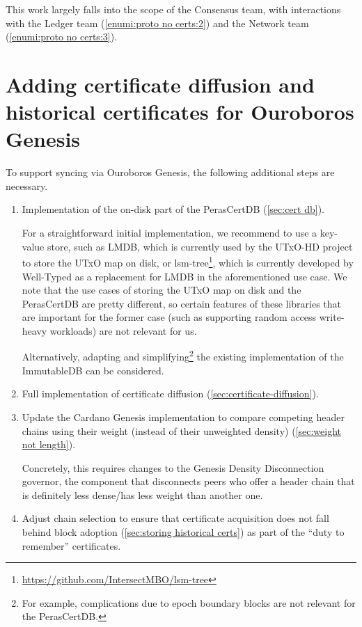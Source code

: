 This work largely falls into the scope of the Consensus team, with interactions with the Ledger team (\ref{enumi:proto no certs:2}) and the Network team (\ref{enumi:proto no certs:3}).

\section{Adding certificate diffusion and historical certificates for Ouroboros Genesis}\label{sec:implementation with genesis}

To support syncing via Ouroboros Genesis, the following additional steps are necessary.
\begin{enumerate}
\item
  Implementation of the on-disk part of the PerasCertDB (\cref{sec:cert db}).

  For a straightforward initial implementation, we recommend to use a key-value store, such as LMDB, which is currently used by the UTxO-HD project to store the UTxO map on disk, or lsm-tree\footnote{\url{https://github.com/IntersectMBO/lsm-tree}}, which is currently developed by Well-Typed as a replacement for LMDB in the aforementioned use case.
  We note that the use cases of storing the UTxO map on disk and the PerasCertDB are pretty different, so certain features of these libraries that are important for the former case (such as supporting random access write-heavy workloads) are not relevant for us.

  Alternatively, adapting and simplifying\footnote{For example, complications due to epoch boundary blocks are not relevant for the PerasCertDB.} the existing implementation of the ImmutableDB can be considered.
\item
  Full implementation of certificate diffusion (\cref{sec:certificate-diffusion}).
\item
  Update the Cardano Genesis implementation \parencite{genesis-implementation-documentation} to compare competing header chains using their weight (instead of their unweighted density) (\cref{sec:weight not length}).

  Concretely, this requires changes to the Genesis Density Disconnection governor, the component that disconnects peers who offer a header chain that is definitely less dense/has less weight than another one.
\item
  Adjust chain selection to ensure that certificate acquisition does not fall behind block adoption (\cref{sec:storing historical certs}) as part of the \enquote{duty to remember} certificates.
\end{enumerate}

